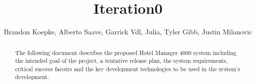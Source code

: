 \begin{frontmatter}
	\title{Iteration0}
	\author{Brandon Koepke, Alberto Saave, Garrick Vdl, Julia, Tyler Gibb, Justin Milanovic}
	\begin{abstract}
		The following document describes the proposed Hotel Manager 4000 system including the intended goal of the project, a tentative release plan, the system requirements, critical success facotrs and the key development technologies to be used in the system's development.
	\end{abstract}
\end{frontmatter}
\tableofcontents
\clearpage
